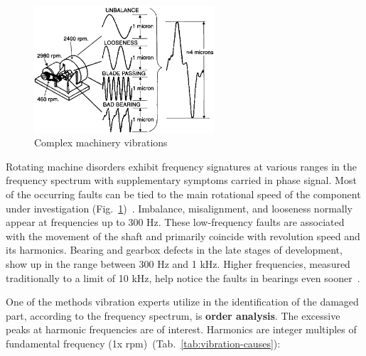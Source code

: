 \begin{figure}[ht]
	\centering
	\includegraphics[width=0.6\textwidth]{assets/analysis/complex-vibrations.png}
	\caption{Complex machinery vibrations~\cite{davies_handbook_2012}}
	\label{fig:machinery-vibrations}
\end{figure}

Rotating machine disorders exhibit frequency signatures at various ranges in the frequency spectrum with supplementary symptoms carried in phase signal. Most of the occurring faults can be tied to the main rotational speed of the component under investigation (Fig.~\ref{fig:machinery-vibrations})~\cite{davies_handbook_2012}. Imbalance, misalignment, and looseness normally appear at frequencies up to 300 Hz. These low-frequency faults are associated with the movement of the shaft and primarily coincide with revolution speed and its harmonics. Bearing and gearbox defects in the late stages of development, show up in the range between 300 Hz and 1 kHz. Higher frequencies, measured traditionally to a limit of 10 kHz, help notice the faults in bearings even sooner~\cite{torres_automatic_2022}.

One of the methods vibration experts utilize in the identification of the damaged part, according to the frequency spectrum, is \textbf{order analysis}. The excessive peaks at harmonic frequencies are of interest. Harmonics are integer multiples of fundamental frequency (1x rpm)~(Tab.~\ref{tab:vibration-causes}):

